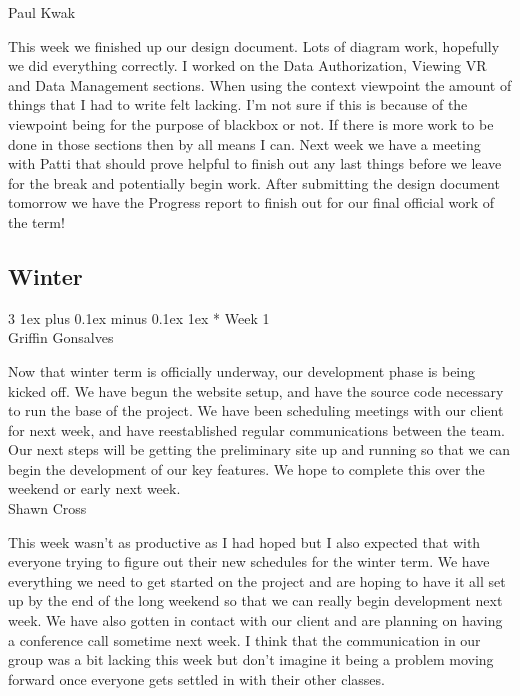 \documentclass[letterpaper, 10pt, draftclsnofoot, compsoc, onecolumn]{IEEEtran}
\makeatletter
\def\subsubsection{\@startsection{subsubsection}%
                                 {3}%
                                 {\z@}%
                                 {1ex plus 0.1ex minus 0.1ex}%
                                 {1ex}%
                                 {\normalfont\normalsize}}%
\makeatother
\begin{document}
Paul Kwak

This week we finished up our design document. Lots of diagram work, hopefully we did everything correctly. I worked on the Data Authorization, Viewing VR and Data Management sections. When using the context viewpoint the amount of things that I had to write felt lacking. I'm not sure if this is because of the viewpoint being for the purpose of blackbox or not. If there is more work to be done in those sections then by all means I can. Next week we have a meeting with Patti that should prove helpful to finish out any last things before we leave for the break and potentially begin work. After submitting the design document tomorrow we have the Progress report to finish out for our final official work of the term!\\


\subsection{Winter}
\subsubsection*{ Week 1}\hspace*{\fill} \\
Griffin Gonsalves

Now that winter term is officially underway, our development phase is being kicked off. We have begun the website setup, and have the source code necessary to run the base of the project. We have been scheduling meetings with our client for next week, and have reestablished regular communications between the team. Our next steps will be getting the preliminary site up and running so that we can begin the development of our key features. We hope to complete this over the weekend or early next week.\\

Shawn Cross

This week wasn't as productive as I had hoped but I also expected that with everyone trying to figure out their new schedules for the winter term. We have everything we need to get started on the project and are hoping to have it all set up by the end of the long weekend so that we can really begin development next week. We have also gotten in contact with our client and are planning on having a conference call sometime next week. I think that the communication in our group was a bit lacking this week but don't imagine it being a problem moving forward once everyone gets settled in with their other classes.\\
\end{document}
